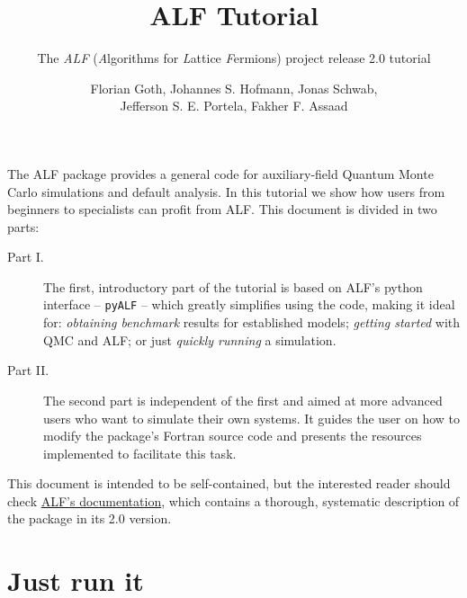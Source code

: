 \documentclass[10pt,modern]{scrartcl}
\numberwithin{exerciseitem}{exercise} %
\newcommand{\ALFver}{2.0}    %
\newcommand{\tutALFver}{2.0} %
\begin{document}
\title{ ALF Tutorial }
\subtitle{The \emph{ALF} (\emph{A}lgorithms for \emph{L}attice \emph{F}ermions) project release \tutALFver{} tutorial} %
\author{Florian Goth,  Johannes S. Hofmann,  Jonas Schwab,\\  Jefferson S. E. Portela,  Fakher F. Assaad }
\maketitle



The ALF package provides a general code for auxiliary-field Quantum Monte Carlo simulations and default analysis. In this tutorial we show how users from beginners to specialists can profit from ALF. This document is divided in two parts:
\begin{description}
\item[Part I.] The first, introductory part of the tutorial is based on ALF's python interface -- \texttt{pyALF} -- which greatly simplifies using the code, making it ideal for: \emph{obtaining benchmark} results for established models; \emph{getting started} with QMC and ALF; or just \emph{quickly running} a simulation.
\item[Part II.] The second part is independent of the first and aimed at more advanced users who want to simulate their own systems. It guides the user on how to modify the package's Fortran source code and presents the resources implemented to facilitate this task.
\end{description}

This document is intended to be self-contained, but the interested reader should check \href{https://git.physik.uni-wuerzburg.de/ALF/ALF/-/blob/ALF-\ALFver/Documentation/doc.pdf}{ALF's documentation}, which contains a thorough, systematic description of the package in its \ALFver{} version.


\part{Just run it}
\end{document}

